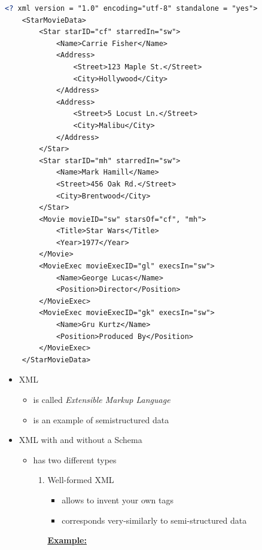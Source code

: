 \documentclass[12pt]{article}
\begin{document}
\begin{enumerate}[1.]
\begin{enumerate}[a)]
    \begin{lstlisting}[language=XML]
    <? xml version = "1.0" encoding="utf-8" standalone = "yes">
    <StarMovieData>
        <Star starID="cf" starredIn="sw">
            <Name>Carrie Fisher</Name>
            <Address>
                <Street>123 Maple St.</Street>
                <City>Hollywood</City>
            </Address>
            <Address>
                <Street>5 Locust Ln.</Street>
                <City>Malibu</City>
            </Address>
        </Star>
        <Star starID="mh" starredIn="sw">
            <Name>Mark Hamill</Name>
            <Street>456 Oak Rd.</Street>
            <City>Brentwood</City>
        </Star>
        <Movie movieID="sw" starsOf="cf", "mh">
            <Title>Star Wars</Title>
            <Year>1977</Year>
        </Movie>
        <MovieExec movieExecID="gl" execsIn="sw">
            <Name>George Lucas</Name>
            <Position>Director</Position>
        </MovieExec>
        <MovieExec movieExecID="gk" execsIn="sw">
            <Name>Gru Kurtz</Name>
            <Position>Produced By</Position>
        </MovieExec>
    </StarMovieData>
    \end{lstlisting}

        \bigskip

    \begin{itemize}
        \item XML
        \begin{itemize}
            \item is called \textit{Extensible Markup Language}
            \item is an example of semistructured data
        \end{itemize}
        \item XML with and without a Schema
        \begin{itemize}
            \item has two different types
            \begin{enumerate}[1.]
                \item Well-formed XML
                \begin{itemize}
                    \item allows to invent your own tags
                    \item corresponds very-similarly to semi-structured data
                \end{itemize}

                \bigskip

                \underline{\textbf{Example:}}


\end{enumerate}
\end{itemize}
\end{itemize}
\end{enumerate}
\end{enumerate}
\end{document}
